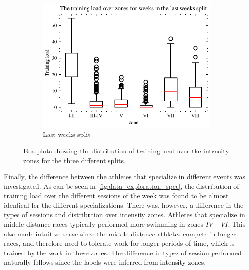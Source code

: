\begin{figure}[ht]
    \begin{subfigure}[t]{0.48\textwidth}
        \centering
        \includegraphics[width=\textwidth]{chapters/figures/data_exploration/last_weeks_zone_boxplot.pdf}
        \captionsetup{width=.9\linewidth}
        \caption{Last weeks split}
    \end{subfigure}
    \caption{Box plots showing the distribution of training load over the intensity zones for the three different splits.}
    \label{fig:data_exploration_zones}
\end{figure}

Finally, the difference between the athletes that specialize in different events was investigated.
As can be seen in \cref{fig:data_exploration_spec}, the distribution of training load over the different sessions of the week was found to be almost identical for the different specializations. 
There was, however, a difference in the types of sessions and distribution over intensity zones.
Athletes that specialize in middle distance races typically performed more swimming in zones $IV-VI$.
This also made intuitive sense since the middle distance athletes compete in longer races, and therefore need to tolerate work for longer periods of time, which is trained by the work in these zones.
The difference in types of session performed naturally follows since the labels were inferred from intensity zones.


